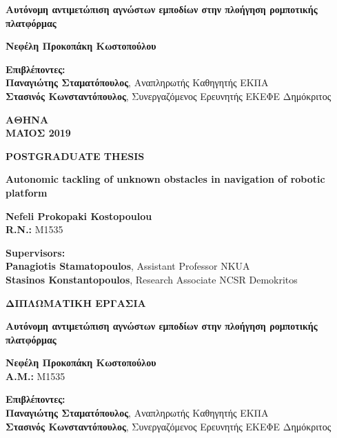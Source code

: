 \begin{center}
	\vspace{1.5cm}
	\Large
	\textbf{Αυτόνομη αντιμετώπιση αγνώστων εμποδίων στην πλοήγηση ρομποτικής πλατφόρμας}
	
	\vspace{1.5cm}
	\normalsize
	\textbf{Νεφέλη Προκοπάκη Κωστοπούλου}
	
	\vspace{1.5cm}
	\textbf{Επιβλέποντες:}\\
	\textbf{Παναγιώτης Σταματόπουλος}, Αναπληρωτής Καθηγητής ΕΚΠΑ\\
	\textbf{Στασινός Κωνσταντόπουλος}, Συνεργαζόμενος Ερευνητής ΕΚΕΦΕ Δημόκριτος
	
	\vfill
	
	\vspace{0.8cm}
	\textbf{ΑΘΗΝΑ}\\
	\vspace{0.2cm}
	\textbf{ΜΑΪΟΣ 2019}
	\newpage
	
	
	\thispagestyle{empty}
	\normalsize
	
	\vspace{1.5cm}
	\textbf{POSTGRADUATE THESIS}
	
	\vspace{1.5cm}
	\textbf{Autonomic tackling of unknown obstacles in navigation of robotic platform}
	
	\vspace{1.5cm}
	\textbf{Nefeli Prokopaki Kostopoulou}\\
	\textbf{R.N.: } M1535
			
	\vspace{1.5cm}
	\textbf{Supervisors:}\\
	\textbf{Panagiotis Stamatopoulos}, Assistant Professor NKUA\\
	\textbf{Stasinos Konstantopoulos}, Research Associate NCSR Demokritos
	\newpage
	
	
	\thispagestyle{empty}
			
	\vspace{1.5cm}
	\textbf{ΔΙΠΛΩΜΑΤΙΚΗ ΕΡΓΑΣΙΑ}
	
	\vspace{1.5cm}
	\textbf{Αυτόνομη αντιμετώπιση αγνώστων εμποδίων στην πλοήγηση ρομποτικής πλατφόρμας}
	
	\vspace{1.5cm}
	\textbf{Νεφέλη Προκοπάκη Κωστοπούλου}\\
	\textbf{Α.Μ.: } Μ1535
	
	\vspace{1.5cm}
	\textbf{Επιβλέποντες:}\\
	\textbf{Παναγιώτης Σταματόπουλος}, Αναπληρωτής Καθηγητής ΕΚΠΑ\\
	\textbf{Στασινός Κωνσταντόπουλος}, Συνεργαζόμενος Ερευνητής ΕΚΕΦΕ Δημόκριτος
\end{center}
